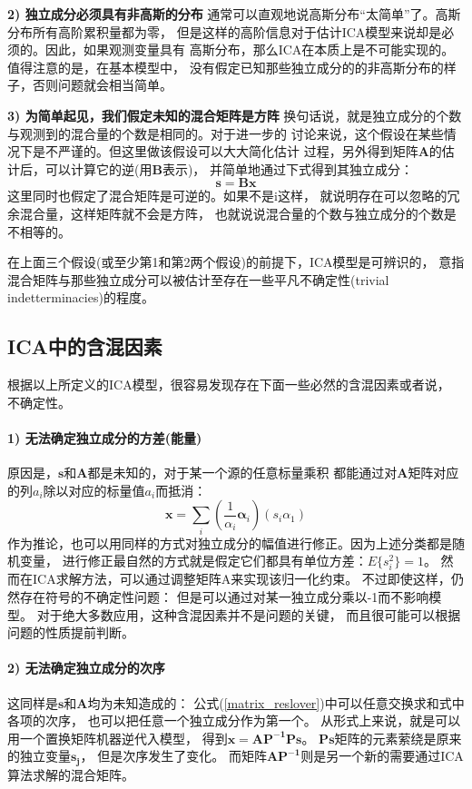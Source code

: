 \textbf{2) 独立成分必须具有非高斯的分布}
通常可以直观地说高斯分布“太简单”了。高斯分布所有高阶累积量都为零，
但是这样的高阶信息对于估计ICA模型来说却是必须的。因此，如果观测变量具有
高斯分布，那么ICA在本质上是不可能实现的。值得注意的是，在基本模型中，
没有假定已知那些独立成分的的非高斯分布的样子，否则问题就会相当简单。

\textbf{3) 为简单起见，我们假定未知的混合矩阵是方阵}
换句话说，就是独立成分的个数与观测到的混合量的个数是相同的。对于进一步的
讨论来说，这个假设在某些情况下是不严谨的。但这里做该假设可以大大简化估计
过程，另外得到矩阵$\bm{A}$的估计后，可以计算它的逆(用$\bm{B}$表示)，
并简单地通过下式得到其独立成分：
\begin{equation}
\bm{s}=\bm{B}\bm{x}
\end{equation}
这里同时也假定了混合矩阵是可逆的。如果不是i这样，
就说明存在可以忽略的冗余混合量，这样矩阵就不会是方阵，
也就说说混合量的个数与独立成分的个数是不相等的。

在上面三个假设(或至少第1和第2两个假设)的前提下，ICA模型是可辨识的，
意指混合矩阵与那些独立成分可以被估计至存在一些平凡不确定性(trivial indetterminacies)的程度。
      
\subsection{ICA中的含混因素}
根据以上所定义的ICA模型，很容易发现存在下面一些必然的含混因素或者说，
不确定性。
\paragraph*{1) 无法确定独立成分的方差(能量)}
原因是，$\bm{s}$和$\bm{A}$都是未知的，对于某一个源的任意标量乘积
都能通过对$\bm{A}$矩阵对应的列$a_i$除以对应的标量值$a_i$而抵消：
\begin{equation}
\bm{x}=\sum_{i} (\frac{1}{{\alpha}_i} \bm{\alpha}_i)(s_i {\alpha}_1)
\end{equation}
作为推论，也可以用同样的方式对独立成分的幅值进行修正。因为上述分类都是随机变量，
进行修正最自然的方式就是假定它们都具有单位方差：$E\{s_i^2\}=1$。
然而在ICA求解方法，可以通过调整矩阵A来实现该归一化约束。
不过即使这样，仍然存在符号的不确定性问题：
但是可以通过对某一独立成分乘以-1而不影响模型。
对于绝大多数应用，这种含混因素并不是问题的关键，
而且很可能可以根据问题的性质提前判断。

\paragraph*{2) 无法确定独立成分的次序}
这同样是$\bm{s}$和$\bm{A}$均为未知造成的：
公式(\ref{matrix_reslover})中可以任意交换求和式中各项的次序，
也可以把任意一个独立成分作为第一个。
从形式上来说，就是可以用一个置换矩阵机器逆代入模型，
得到$\bm{x=AP^{-1}Ps}$。
$\bm{Ps}$矩阵的元素萦绕是原来的独立变量$\bm{s_j}$，
但是次序发生了变化。
而矩阵$\bm{AP^{-1}}$则是另一个新的需要通过ICA算法求解的混合矩阵。
 
